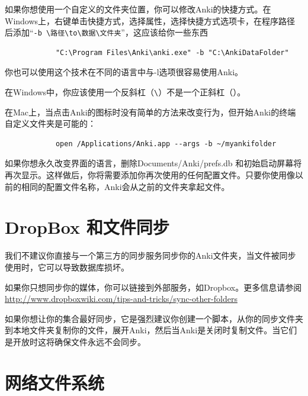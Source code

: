 \documentclass[a4paper]{book}
\begin{document}
		如果你想使用一个自定义的文件夹位置，你可以修改Anki的快捷方式。在Windows上，右键单击快捷方式，选择属性，选择快捷方式选项卡，在程序路径后添加“\verb|-b \路径\to\数据\文件夹|”，这应该给你一些东西
		
		\begin{shaded}\begin{verbatim}
			"C:\Program Files\Anki\anki.exe" -b "C:\AnkiDataFolder"
			\end{verbatim}\end{shaded}
		
		你也可以使用这个技术在不同的语言中与-l选项很容易使用Anki。
		
		\begin{shaded}
			在Windows中，你应该使用一个反斜杠（\verb|\|）不是一个正斜杠（\/）。
		\end{shaded}
		
		在Mac上，当点击Anki的图标时没有简单的方法来改变行为，但开始Anki的终端自定义文件夹是可能的：
		
		\begin{shaded}\begin{verbatim}
			open /Applications/Anki.app --args -b ~/myankifolder
			\end{verbatim}\end{shaded}
		
		
		\begin{shaded}
			如果你想永久改变界面的语言，删除Documents/Anki/prefs.db 和初始启动屏幕将再次显示。这样做后，你将需要添加你再次使用的任何配置文件。只要你使用像以前的相同的配置文件名称，Anki会从之前的文件夹拿起文件。
		\end{shaded}
		
		\section{DropBox 和文件同步}
		
		我们不建议你直接与一个第三方的同步服务同步你的Anki文件夹，当文件被同步使用时，它可以导致数据库损坏。
		
		如果你只想同步你的媒体，你可以链接到外部服务，如Dropbox。更多信息请参阅
		\url{http://www.dropboxwiki.com/tips-and-tricks/sync-other-folders}
		
		如果你想让你的集合最好同步，它是强烈建议你创建一个脚本，从你的同步文件夹到本地文件夹复制你的文件，展开Anki，然后当Anki是关闭时复制文件。当它们是开放时这将确保文件永远不会同步。
		
		\section{网络文件系统}
		
\end{document}
